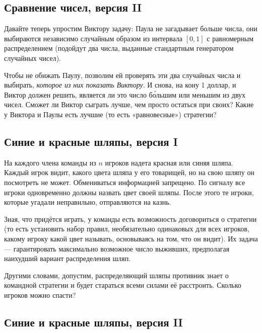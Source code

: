\subsection*{Сравнение чисел, версия II} %

Давайте теперь упростим Виктору задачу:
Паула не загадывает больше числа, они выбираются независимо случайным образом из интервала $[0,1]$ с равномерным распределением (подойдут два числа, выданные стандартным генератором случайных чисел).

Чтобы не обижать Паулу, позволим ей проверять эти два случайных числа и выбирать, \emph{которое из них показать Виктору}. %
И снова, на кону 1 доллар, и Виктор должен решить, является ли это число б\'{о}льшим или меньшим из двух чисел.
Сможет ли Виктор сыграть лучше, чем просто остаться при своих?
Какие у Виктора и Паулы есть лучшие (то есть «равновесные») стратегии?

\subsection*{Синие и красные шляпы, версия I} %

На каждого члена команды из $n$ игроков надета красная или синяя шляпа.
Каждый игрок видит, какого цвета шляпа у его товарищей, но на свою шляпу он посмотреть не может.
Обмениваться информацией запрещено.
По сигналу все игроки одновременно должны назвать цвет своей шляпы.
После этого те игроки, которые угадали неправильно,  отправляются на казнь.

Зная, что придётся играть, у команды есть возможность договориться о стратегии
(то есть установить набор правил, необязательно одинаковых для всех игроков, какому игроку какой цвет называть, основываясь на том, что он видит).
Их задача --- гарантировать максимально возможное число выживших, предполагая наихудший вариант распределения шляп.

\medskip

Другими словами, допустим, распределяющий шляпы противник знает о командной стратегии и будет стараться всеми силами её расстроить.
Сколько игроков можно спасти?


\subsection*{Синие и красные шляпы, версия II} %

